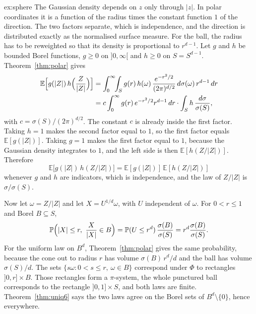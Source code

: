 \begin{solution}{ex:sphere}
\idea The Gaussian density depends on $z$ only through $|z|$. In polar coordinates it is a function of the radius times the constant function $1$ of the direction. The two factors separate, which is independence, and the direction is distributed exactly as the normalised surface measure. For the ball, the radius has to be reweighted so that its density is proportional to $r^{d-1}$.
\writeup Let $g$ and $h$ be bounded Borel functions, $g\ge 0$ on $]0,\infty[$ and $h\ge 0$ on $S=S^{d-1}$. Theorem~\ref{thm:polar} gives
\begin{align*}
\mathbb E\Bigl[g(|Z|)\,h\Bigl(\frac{Z}{|Z|}\Bigr)\Bigr]
&=\int_0^\infty\!\!\int_S g(r)\,h(\omega)\,\frac{e^{-r^2/2}}{(2\pi)^{d/2}}\,d\sigma(\omega)\,r^{d-1}\,dr\\
&=c\int_0^\infty g(r)\,e^{-r^2/2}r^{d-1}\,dr\cdot\int_S h\,\frac{d\sigma}{\sigma(S)},
\end{align*}
with $c=\sigma(S)/(2\pi)^{d/2}$. The constant $c$ is already inside the first factor. Taking $h=1$ makes the second factor equal to $1$, so the first factor equals $\mathbb E[g(|Z|)]$. Taking $g=1$ makes the first factor equal to $1$, because the Gaussian density integrates to $1$, and the left side is then $\mathbb E[h(Z/|Z|)]$. Therefore
\[
\mathbb E\bigl[g(|Z|)\,h(Z/|Z|)\bigr]=\mathbb E[g(|Z|)]\,\mathbb E[h(Z/|Z|)]
\]
whenever $g$ and $h$ are indicators, which is independence, and the law of $Z/|Z|$ is $\sigma/\sigma(S)$.

Now let $\omega=Z/|Z|$ and let $X=U^{1/d}\omega$, with $U$ independent of $\omega$. For $0<r\le 1$ and Borel $B\subseteq S$,
\[
\mathbb P\Bigl(|X|\le r,\ \frac{X}{|X|}\in B\Bigr)=\mathbb P(U\le r^d)\,\frac{\sigma(B)}{\sigma(S)}=r^d\frac{\sigma(B)}{\sigma(S)}.
\]
For the uniform law on $B^d$, Theorem~\ref{thm:polar} gives the same probability, because the cone out to radius $r$ has volume $\sigma(B)\,r^d/d$ and the ball has volume $\sigma(S)/d$. The sets $\{s\omega:0<s\le r,\ \omega\in B\}$ correspond under $\Phi$ to rectangles $]0,r]\times B$. Those rectangles form a $\pi$-system, the whole punctured ball corresponds to the rectangle $]0,1]\times S$, and both laws are finite. Theorem~\ref{thm:uniq6} says the two laws agree on the Borel sets of $B^d\setminus\{0\}$, hence everywhere.
\end{solution}

